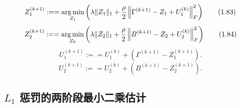 \begin{equation}
 Z_1^{(k+1)}\mathrel{:==}\operatorname*{arg\,min}_{Z_1}
 \left(\lambda\lVert Z_1\rVert_1
       +\frac\rho2\left\lVert\Gamma^{(k+1)}-Z_1+U_1^{(k)}\right\rVert_F^2\right)
 \tag{1.83}
\end{equation}
\begin{equation}
 Z_2^{(k+1)}\mathrel{:==}\operatorname*{arg\,min}_{Z_2}
 \left(\lambda\lVert Z_2\rVert_1
       +\frac\rho2\left\lVert B^{(k+1)}-Z_2+U_2^{(k)}\right\rVert_F^2\right)
 \tag{1.84}
\end{equation}
\begin{equation}
 U_1^{(k+1)}\mathrel{:==}U_1^{(k)}
       +\left(\Gamma^{(k+1)}-Z_1^{(k+1)}\right).
 \tag{1.85}
\end{equation}
\begin{equation}
 U_2^{(k+1)}\mathrel{:==}U_2^{(k)}
       +\left(B^{(k+1)}-Z_2^{(k+1)}\right).
 \tag{1.86}
\end{equation}

\subsection{\texorpdfstring{$L_1$}{L1} 惩罚的两阶段最小二乘估计}
\label{sec:ch01b-l1-2sls}

